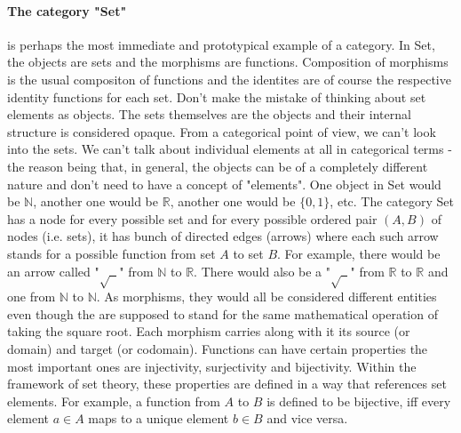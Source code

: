 \paragraph{The category "Set"} is perhaps the most immediate and prototypical example of a category. In Set, the objects are sets and the morphisms are functions. Composition of morphisms is the usual compositon of functions and the identites are of course the respective identity functions for each set. Don't make the mistake of thinking about set elements as objects. The sets themselves are the objects and their internal structure is considered opaque. From a categorical point of view, we can't look into the sets. We can't talk about individual elements at all in categorical terms - the reason being that, in general, the objects can be of a completely different nature and don't need to have a concept of "elements". One object in Set would be $\mathbb{N}$, another one would be $\mathbb{R}$, another one would be $\{0,1\}$, etc. The category Set has a node for every possible set and for every possible ordered pair $(A,B)$ of nodes (i.e. sets), it has bunch of directed edges (arrows) where each such arrow stands for a possible function from set $A$ to set $B$. For example, there would be an arrow called "$\sqrt{\; \;}$" from $\mathbb{N}$ to $\mathbb{R}$. There would also be a "$\sqrt{\; \;}$" from $\mathbb{R}$ to $\mathbb{R}$ and one from $\mathbb{N}$ to $\mathbb{N}$. As morphisms, they would all be considered different entities even though the are supposed to stand for the same mathematical operation of taking the square root. Each morphism carries along with it its source (or domain) and target (or codomain). Functions can have certain properties the most important ones are injectivity, surjectivity and bijectivity. Within the framework of set theory, these properties are defined in a way that references set elements. For example, a function from $A$ to $B$ is defined to be bijective, iff every element $a \in A$ maps to a unique element $b \in B$ and vice versa.

